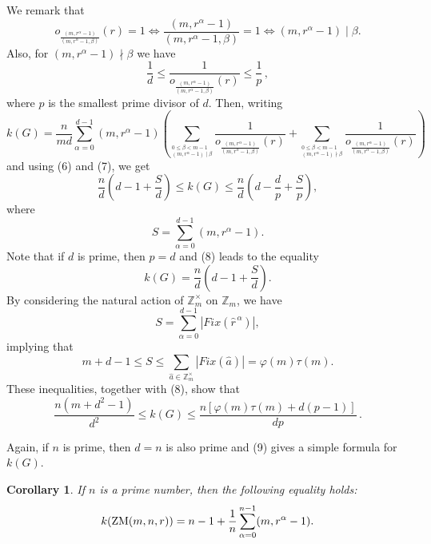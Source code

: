\documentclass[12pt]{article}
\newtheorem{corollary}[theorem]{Corollary}
\newcommand{\dd}{\displaystyle }
\newcommand{\0}{{\leqno}}
\begin{document}
We remark that 
\begin{equation}
o_{\frac{(m,r^{\alpha}-1)}{(m,r^{\alpha}-1,\beta)}}(r)=1\Leftrightarrow\frac{(m,r^{\alpha}-1)}{(m,r^{\alpha}-1,\beta)}=1\Leftrightarrow (m,r^{\alpha}-1)\mid\beta.
\end{equation}Also, for $(m,r^{\alpha}-1)\nmid\beta$ we have
\begin{equation}
\frac{1}{d}\leq \frac{1}{o_{\frac{(m,r^{\alpha}-1)}{(m,r^{\alpha}-1,\beta)}}(r)}\leq\frac{1}{p}\,,
\end{equation}where $p$ is the smallest prime divisor of $d$. Then, writing 
\begin{equation}
k(G)=\dd\frac{n}{md}\dd\sum_{\alpha=0}^{d-1}(m,r^{\alpha}-1)\!\!\left(\dd\sum_{^{0\leq\beta<m-1}_{(m,r^{\alpha}-1)\mid\beta}}\!\!\frac{1}{o_{\frac{(m,r^{\alpha}-1)}{(m,r^{\alpha}-1,\beta)}}(r)}+\!\!\!\!\dd\sum_{^{0\leq\beta<m-1}_{(m,r^{\alpha}-1)\nmid\beta}}\!\!\frac{1}{o_{\frac{(m,r^{\alpha}-1)}{(m,r^{\alpha}-1,\beta)}}(r)}\!\right)\nonumber
\end{equation}and using (6) and (7), we get
\begin{equation}
\frac{n}{d}\left(d-1+\frac{S}{d}\right)\leq k(G)\leq\frac{n}{d}\left(d-\frac{d}{p}+\frac{S}{p}\right),
\end{equation}where $$S=\sum_{\alpha=0}^{d-1}(m,r^{\alpha}-1).$$Note that if $d$ is prime, then $p=d$ and (8) leads to the equality
\begin{equation}
k(G)=\frac{n}{d}\left(d-1+\frac{S}{d}\right).
\end{equation}By considering the natural action of $\mathbb{Z}^{\times}_m$ on $\mathbb{Z}_m$, we have $$S=\sum_{\alpha=0}^{d-1}|Fix(\hat{r}^{\,\alpha})|,$$implying that
\begin{equation}
m+d-1\leq S\leq\sum_{\hat{a}\in\mathbb{Z}^{\times}_m}|Fix(\hat{a})|=\varphi(m)\tau(m).\nonumber
\end{equation}These inequalities, together with (8), show that
\begin{equation}
\frac{n(m+d^2-1)}{d^2}\leq k(G)\leq\frac{n[\varphi(m)\tau(m)+d(p-1)]}{dp}\,.\nonumber
\end{equation}
\smallskip

Again, if $n$ is prime, then $d=n$ is also prime and (9) gives a simple formula for $k(G)$.

\begin{corollary}
If $n$ is a prime number, then the following equality holds:
\begin{equation}
k({\rm ZM}(m,n,r))=n-1+\frac{1}{n}\sum_{\alpha=0}^{n-1}(m,r^{\alpha}-1).\nonumber
\end{equation}
\end{corollary}
\end{document}
